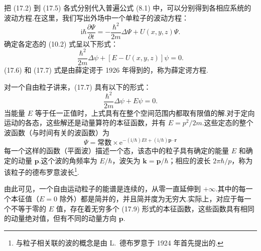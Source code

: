 把 (17.2) 到 (17.5) 各式分别代入普遍公式 (8.1) 中，可以分别得到各相应系统的波动方程.在这里，我们写出外场中一个单粒子的波动方程：
\begin{equation}
  \mathrm{i}\hbar\frac{\partial\varPsi}{\partial t}
  =-\frac{\hbar^2}{2m}\Delta\varPsi+U(x,y,z)\varPsi.
\end{equation}
确定各定态的 (10.2) 式呈以下形式：
\begin{equation}
  \frac{\hbar^2}{2m}\Delta\psi+\left[E-U(x,y,z)\right]\psi=0.
\end{equation}
(17.6) 和 (17.7) 式是由薛定谔于 1926 年得到的，称为薛定谔方程.

对一个自由粒子讲来，(17.7) 具有以下的形式：
\begin{equation}
  \frac{\hbar^2}{2m}\Delta\psi+E\psi=0.
\end{equation}
当能量 $E$ 等于任一正值时，上式具有在整个空间范围内都取有限值的解.对于定向运动的各态，这些解还是动量算符的本征函数，并有 $E=p^2/2m$.这些定态的整个波函数（与时间有关的波函数）为
\begin{equation}
  \varPsi=\text{常数}\times
  \mathrm{e}^{-(\mathrm{i}/\hbar)Et+(\mathrm{i}/\hbar)\boldsymbol{p}\cdot\boldsymbol{r}}
\end{equation}
每一个这样的函数（平面波）描述一个态，该态中的粒子具有确定的能量 $E$ 和确定的动量 $\boldsymbol{p}$.这个波的角频率为 $E/\hbar$，波矢为 $\boldsymbol{k}=\boldsymbol{p}/\hbar$；相应的波长 $2\pi\hbar/p$，称为该粒子的德布罗意波长\footnote{与粒子相关联的波的概念是由 L.~德布罗意于 1924 年首先提出的.}.

由此可见，一个自由运动粒子的能谱是连续的，从零一直延伸到 $+\infty$.其中的每一个本征值（$E=0$ 除外）都是简并的，并且简并度为无穷大.实际上，对应于每一个不等于零的 $E$ 值，存在着无穷多个 (17.9) 形式的本征函数，这些函数具有相同的动量绝对值，但有不同的动量方向 $\boldsymbol{p}$.


